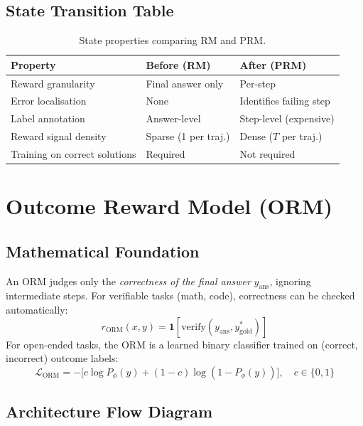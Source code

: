 \subsection{State Transition Table}
\begin{table}[h]\centering
\begin{tabular}{lll}\toprule
\textbf{Property} & \textbf{Before (RM)} & \textbf{After (PRM)}\\\midrule
Reward granularity & Final answer only & Per-step\\
Error localisation & None & Identifies failing step\\
Label annotation & Answer-level & Step-level (expensive)\\
Reward signal density & Sparse (1 per traj.) & Dense ($T$ per traj.)\\
Training on correct solutions & Required & Not required\\\bottomrule
\end{tabular}
\caption{State properties comparing RM and PRM.}
\end{table}

\newpage
\section{Outcome Reward Model (ORM)}

\subsection{Mathematical Foundation}
An ORM judges only the \emph{correctness of the final answer} $y_{\text{ans}}$, ignoring intermediate steps. For verifiable tasks (math, code), correctness can be checked automatically:
\begin{equation}
  r_{\text{ORM}}(x, y) = \mathbf{1}[\text{verify}(y_{\text{ans}}, y^*_{\text{gold}})]
\end{equation}
For open-ended tasks, the ORM is a learned binary classifier trained on (correct, incorrect) outcome labels:
\begin{equation}
  \mathcal{L}_{\text{ORM}} = -\bigl[c\log P_\phi(y) + (1-c)\log(1-P_\phi(y))\bigr],\quad c \in \{0,1\}
\end{equation}

\subsection{Architecture Flow Diagram}

